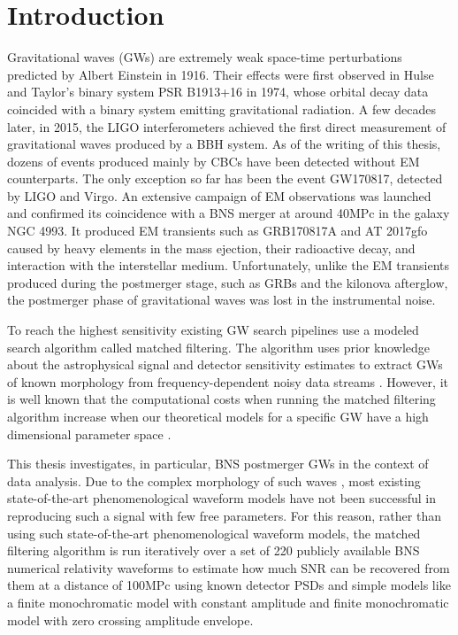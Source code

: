 
\chapter*{Introduction}

Gravitational waves (GWs) are extremely weak space-time perturbations predicted by Albert Einstein in 1916\cite{Einstein:1916cc}. Their effects were first observed in Hulse and Taylor's binary system PSR B1913+16 in 1974, whose orbital decay data coincided with a binary system emitting gravitational radiation\cite{Weisberg:1981mt}. A few decades later, in 2015, the LIGO interferometers achieved the first direct measurement of gravitational waves produced by a BBH system\cite{LIGOScientific:2016aoc}. As of the writing of this thesis, dozens of events produced mainly by CBCs have been detected without EM counterparts. The only exception so far has been the event GW170817\cite{LIGOScientific:2017vwq}, detected by LIGO and Virgo. An extensive campaign of EM observations was launched and confirmed its coincidence with a BNS merger at around 40MPc in the galaxy NGC 4993. It produced EM transients such as GRB170817A and AT 2017gfo caused by heavy elements in the mass ejection, their radioactive decay, and interaction with the interstellar medium\cite{Abbott_2017, LIGOScientific:2017ync, 10.1093/mnras/stz1564}. Unfortunately, unlike the EM transients produced during the postmerger stage, such as GRBs and the kilonova afterglow, the postmerger phase of gravitational waves was lost in the instrumental noise\cite{LIGOScientific:2018hze, LIGOScientific:2018urg, LIGOScientific:2017fdd}. 

To reach the highest sensitivity existing GW search pipelines use a modeled search algorithm called matched filtering. The algorithm uses prior knowledge about the astrophysical signal and detector sensitivity estimates to extract GWs of known morphology from frequency-dependent noisy data streams \cite{Usman:2015kfa, Sachdev:2019vvd, Aubin:2020goo}. However, it is well known that the computational costs when running the matched filtering algorithm increase when our theoretical models for a specific GW have a high dimensional parameter space \cite{Allen_2021, Dhurkunde:2021csz}.

This thesis investigates, in particular, BNS postmerger GWs in the context of data analysis. Due to the complex morphology of such waves \cite{Maggiore:2018sht, Shibata:2019wef,Radice_2020}, most existing state-of-the-art phenomenological waveform models have not been successful in reproducing such a signal with few free parameters\cite{Breschi:2019srl, Tsang:2019esi, Soultanis:2021oia, https://doi.org/10.48550/arxiv.2205.09112}. For this reason, rather than using such state-of-the-art phenomenological waveform models, the matched filtering algorithm is run iteratively over a set of 220 publicly available BNS numerical relativity waveforms to estimate how much SNR can be recovered from them at a distance of 100MPc using known detector PSDs and simple models like a finite monochromatic model with constant amplitude and finite monochromatic model with zero crossing amplitude envelope.

